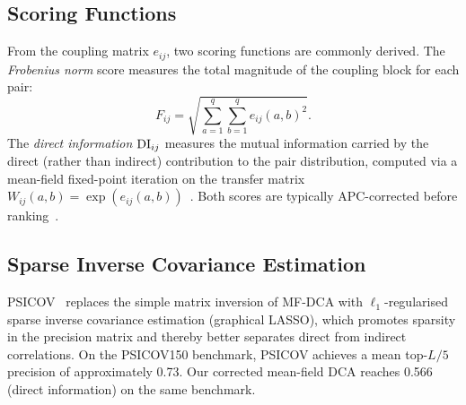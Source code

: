 \subsection{Scoring Functions}
From the coupling matrix $e_{ij}$, two scoring functions are commonly derived.
The \emph{Frobenius norm} score measures the total magnitude of the coupling
block for each pair:
\begin{equation}
	F_{ij} = \sqrt{\sum_{a=1}^{q}\sum_{b=1}^{q} e_{ij}(a,b)^2}.
	\label{eq:frobenius}
\end{equation}
The \emph{direct information} $\mathrm{DI}_{ij}$ measures the mutual information
carried by the direct (rather than indirect) contribution to the pair
distribution, computed via a mean-field fixed-point iteration on the transfer
matrix $W_{ij}(a,b) = \exp(e_{ij}(a,b))$~\cite{morcos2011}.  Both scores are
typically APC-corrected before ranking~\cite{dunn2008}.

\subsection{Sparse Inverse Covariance Estimation}
PSICOV~\cite{jones2012} replaces the simple matrix inversion of MF-DCA with
$\ell_1$-regularised sparse inverse covariance estimation (graphical LASSO),
which promotes sparsity in the precision matrix and thereby better separates
direct from indirect correlations.  On the PSICOV150 benchmark, PSICOV achieves
a mean top-$L/5$ precision of approximately 0.73.  Our corrected mean-field
DCA reaches 0.566 (direct information) on the same benchmark.
